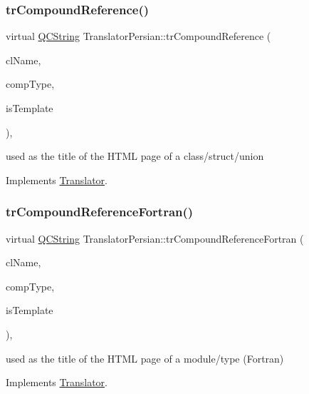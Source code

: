 \subsubsection{\texorpdfstring{trCompoundReference()}{trCompoundReference()}}
{\footnotesize\ttfamily virtual \mbox{\hyperlink{class_q_c_string}{Q\+C\+String}} Translator\+Persian\+::tr\+Compound\+Reference (\begin{DoxyParamCaption}\item[{const char $\ast$}]{cl\+Name,  }\item[{\mbox{\hyperlink{class_class_def_ae70cf86d35fe954a94c566fbcfc87939}{Class\+Def\+::\+Compound\+Type}}}]{comp\+Type,  }\item[{bool}]{is\+Template }\end{DoxyParamCaption})\hspace{0.3cm}{\ttfamily [inline]}, {\ttfamily [virtual]}}

used as the title of the H\+T\+ML page of a class/struct/union 

Implements \mbox{\hyperlink{class_translator}{Translator}}.

\mbox{\label{class_translator_persian_a00ceb20bf1128a90d2e57f9cc3351181}} 
\subsubsection{\texorpdfstring{trCompoundReferenceFortran()}{trCompoundReferenceFortran()}}
{\footnotesize\ttfamily virtual \mbox{\hyperlink{class_q_c_string}{Q\+C\+String}} Translator\+Persian\+::tr\+Compound\+Reference\+Fortran (\begin{DoxyParamCaption}\item[{const char $\ast$}]{cl\+Name,  }\item[{\mbox{\hyperlink{class_class_def_ae70cf86d35fe954a94c566fbcfc87939}{Class\+Def\+::\+Compound\+Type}}}]{comp\+Type,  }\item[{bool}]{is\+Template }\end{DoxyParamCaption})\hspace{0.3cm}{\ttfamily [inline]}, {\ttfamily [virtual]}}

used as the title of the H\+T\+ML page of a module/type (Fortran) 

Implements \mbox{\hyperlink{class_translator}{Translator}}.

